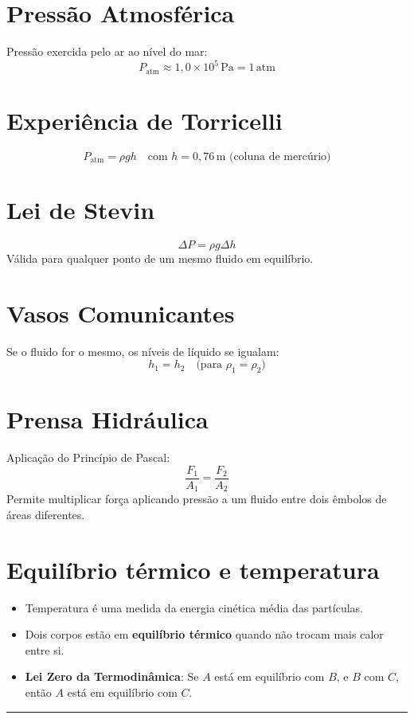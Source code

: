 \documentclass[a4paper,12pt]{article}
\begin{document}
\begin{multicols}{2}
\section{Pressão Atmosférica}
Pressão exercida pelo ar ao nível do mar:
\[
P_{\text{atm}} \approx 1{,}0 \times 10^5\, \text{Pa} = 1\, \text{atm}
\]

\section{Experiência de Torricelli}
\[
P_{\text{atm}} = \rho g h \quad \text{com } h = 0{,}76\, \text{m (coluna de mercúrio)}
\]

\section{Lei de Stevin}
\[
\Delta P = \rho g \Delta h
\]
Válida para qualquer ponto de um mesmo fluido em equilíbrio.

\section{Vasos Comunicantes}
Se o fluido for o mesmo, os níveis de líquido se igualam:
\[
h_1 = h_2
\quad \text{(para } \rho_1 = \rho_2)
\]

\section{Prensa Hidráulica}
Aplicação do Princípio de Pascal:
\[
\frac{F_1}{A_1} = \frac{F_2}{A_2}
\]
Permite multiplicar força aplicando pressão a um fluido entre dois êmbolos de áreas diferentes.

\section{Equilíbrio térmico e temperatura}
\begin{itemize}
    \item Temperatura é uma medida da energia cinética média das partículas.
    \item Dois corpos estão em \textbf{equilíbrio térmico} quando não trocam mais calor entre si.
    \item \textbf{Lei Zero da Termodinâmica}: Se $A$ está em equilíbrio com $B$, e $B$ com $C$, então $A$ está em equilíbrio com $C$.
\end{itemize}

\noindent\rule{\linewidth}{1pt}\\


\end{multicols}
\end{document}
